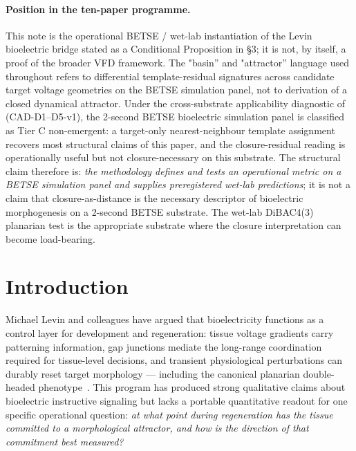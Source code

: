 \documentclass[11pt,a4paper]{article}
\begin{document}
\paragraph{Position in the ten-paper programme.} This note is the operational BETSE / wet-lab instantiation of the Levin bioelectric bridge stated as a Conditional Proposition in \citet{SmartProcessingToPOV} \S 3; it is not, by itself, a proof of the broader VFD framework. The "basin'' and "attractor'' language used throughout refers to differential template-residual signatures across candidate target voltage geometries on the BETSE simulation panel, not to derivation of a closed dynamical attractor. Under the cross-substrate applicability diagnostic of \citet{SmartClosureDistance} (CAD-D1--D5-v1), the 2-second BETSE bioelectric simulation panel is classified as Tier C non-emergent: a target-only nearest-neighbour template assignment recovers most structural claims of this paper, and the closure-residual reading is operationally useful but not closure-necessary on this substrate. The structural claim therefore is: \emph{the methodology defines and tests an operational metric on a BETSE simulation panel and supplies preregistered wet-lab predictions}; it is not a claim that closure-as-distance is the necessary descriptor of bioelectric morphogenesis on a 2-second BETSE substrate. The wet-lab DiBAC4(3) planarian test is the appropriate substrate where the closure interpretation can become load-bearing.

\section{Introduction}

Michael Levin and colleagues have argued that bioelectricity functions as a control layer for development and regeneration: tissue voltage gradients carry patterning information, gap junctions mediate the long-range coordination required for tissue-level decisions, and transient physiological perturbations can durably reset target morphology --- including the canonical planarian double-headed phenotype~\citep{beane2013bioelectric,pai2012transmembrane,durant2019role,levin2018bioelectric,pietak2016exploring}. This program has produced strong qualitative claims about bioelectric instructive signaling but lacks a portable quantitative readout for one specific operational question: \emph{at what point during regeneration has the tissue committed to a morphological attractor, and how is the direction of that commitment best measured?}
\end{document}
